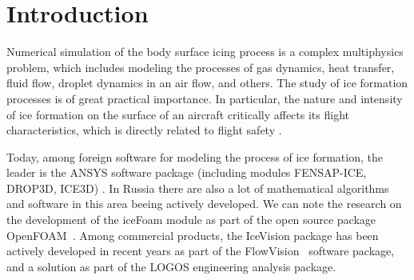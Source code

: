 \documentclass[
11pt,%
tightenlines,%
twoside,%
onecolumn,%
nofloats,%
nobibnotes,%
nofootinbib,%
superscriptaddress,%
noshowpacs,%
centertags]%
{revtex4}
\begin{document}


\maketitle


\section{Introduction}

Numerical simulation of the body surface icing process is a complex multiphysics problem, which includes modeling the processes of gas dynamics, heat transfer, fluid flow, droplet dynamics in an air flow, and others.
The study of ice formation processes is of great practical importance.
In particular, the nature and intensity of ice formation on the surface of an aircraft critically affects its flight characteristics, which is directly related to flight safety \cite{Raj}.

Today, among foreign software for modeling the process of ice formation, the leader is the ANSYS software package (including modules FENSAP-ICE, DROP3D, ICE3D) \cite{Martini}.
In Russia there are also a lot of mathematical algorithms and software in this area beeing actively developed.
We can note the research on the development of the iceFoam module as part of the open source package OpenFOAM~\cite{Strijhak}.
Among commercial products, the IceVision package has been actively developed in recent years as part of the FlowVision~\cite{Sorokin} software package, and a solution as part of the LOGOS \cite{Galanov} engineering analysis package.
\end{document}
